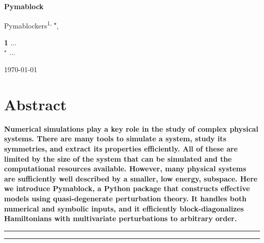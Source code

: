 \documentclass[submission, Codebases]{SciPost}
\begin{document}
\begin{center}
{\Large \textbf{Pymablock}}
\end{center}

\begin{center}
Pymablockers\textsuperscript{1, $\star$},
\end{center}

\begin{center}
{\bf 1} ...
\\
${}^\star$ {\small \sf ...}
\end{center}

\begin{center}
    \today
\end{center}

\section*{Abstract}
{\bf
Numerical simulations play a key role in the study of complex physical systems.
There are many tools to simulate a system, study its symmetries, and extract its properties efficiently.
All of these are limited by the size of the system that can be simulated and the computational resources available.
However, many physical systems are sufficiently well described by a smaller, low energy, subspace.
Here we introduce Pymablock, a Python package that constructs effective models using quasi-degenerate perturbation theory.
It handles both numerical and symbolic inputs, and it efficiently block-diagonalizes Hamiltonians with multivariate perturbations to arbitrary order.
}

\vspace{10pt}
\noindent\rule{\textwidth}{1pt}
\tableofcontents\thispagestyle{fancy}
\noindent\rule{\textwidth}{1pt}
\vspace{10pt}

\listoftodos







\printglossaries





\nolinenumbers
\end{document}
